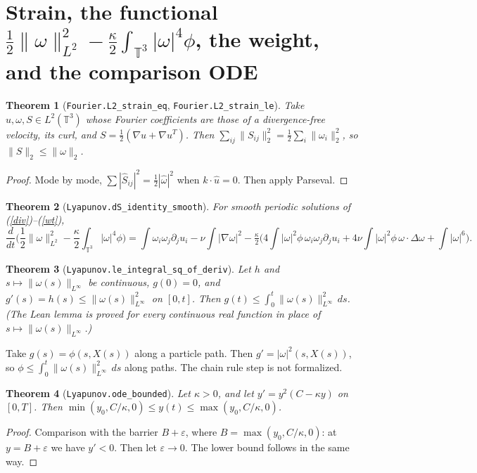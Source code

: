 \documentclass[11pt]{article}
\newtheorem{theorem}{Theorem}\newtheorem{lemma}[theorem]{Lemma}\theoremstyle{definition}\newtheorem{definition}[theorem]{Definition}
\begin{document}
\section{Strain, the functional $\frac12\|\omega\|_{L^2}^2-\frac{\kappa}{2}\int_{\mathbb{T}^3}|\omega|^4\phi$, the weight, and the comparison ODE}
\begin{theorem}[\texttt{Fourier.L2\_strain\_eq}, \texttt{Fourier.L2\_strain\_le}]
Take $u,\omega,S\in L^2(\mathbb{T}^3)$ whose Fourier coefficients are those of a divergence-free
velocity, its curl, and $S=\frac12(\nabla u+\nabla u^T)$. Then
$\sum_{ij}\|S_{ij}\|_2^2=\frac12\sum_i\|\omega_i\|_2^2$, so $\|S\|_2\le\|\omega\|_2$.
\end{theorem}
\begin{proof}Mode by mode, $\sum|\hat S_{ij}|^2=\frac12|\hat\omega|^2$ when $k\cdot\hat u=0$. Then apply Parseval.\end{proof}
\begin{theorem}[\texttt{Lyapunov.dS\_identity\_smooth}]
For smooth periodic solutions of (\ref{div})--(\ref{wt}),
\[\frac{d}{dt}\Big(\frac12\|\omega\|_{L^2}^2-\frac{\kappa}{2}\int_{\mathbb{T}^3}|\omega|^4\phi\Big)=\int\omega_i\omega_j\partial_ju_i-\nu\int|\nabla\omega|^2-\tfrac{\kappa}{2}\Big(4\int|\omega|^2\phi\,\omega_i\omega_j\partial_ju_i+4\nu\int|\omega|^2\phi\,\omega\cdot\Delta\omega+\int|\omega|^6\Big).\]
\end{theorem}
\begin{theorem}[\texttt{Lyapunov.le\_integral\_sq\_of\_deriv}]
Let $h$ and $s\mapsto\|\omega(s)\|_{L^\infty}$ be continuous, $g(0)=0$, and $g'(s)=h(s)\le\|\omega(s)\|_{L^\infty}^2$ on $[0,t]$. Then $g(t)\le\int_0^t\|\omega(s)\|_{L^\infty}^2\,ds$.
(The Lean lemma is proved for every continuous real function in place of $s\mapsto\|\omega(s)\|_{L^\infty}$.)
\end{theorem}
Take $g(s)=\phi(s,X(s))$ along a particle path. Then $g'=|\omega|^2(s,X(s))$, so $\phi\le\int_0^t\|\omega(s)\|_{L^\infty}^2\,ds$
along paths. The chain rule step is not formalized.
\begin{theorem}[\texttt{Lyapunov.ode\_bounded}]
Let $\kappa>0$, and let $y'=y^2(C-\kappa y)$ on $[0,T]$. Then $\min(y_0,C/\kappa,0)\le y(t)\le\max(y_0,C/\kappa,0)$.
\end{theorem}
\begin{proof}Comparison with the barrier $B+\varepsilon$, where $B=\max(y_0,C/\kappa,0)$: at $y=B+\varepsilon$ we have $y'<0$.
Then let $\varepsilon\to0$. The lower bound follows in the same way.\end{proof}
\end{document}
